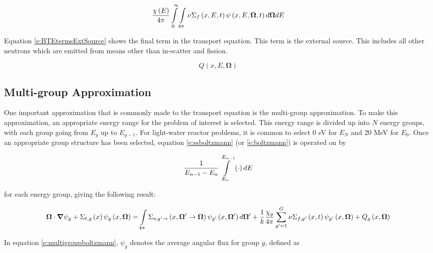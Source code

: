 \begin{equation}\label{e:BTEtermsFissionSource}
\frac{\chi\left(E\right)}{4\pi} \intop_0^{\infty} \intop_{4\pi} \nu \Sigma_f\left(x,E,t\right) \psi\left(x,E,\bm \Omega,t\right) d\bm\Omega dE
\end{equation}

Equation \ref{e:BTEtermsExtSource} shows the final term in the transport equation.  This term is the external source.  This includes all other neutrons which are emitted from means other than in-scatter and fission.

\begin{equation}\label{e:BTEtermsExtSource}
Q\left(x,E,\bm\Omega\right)
\end{equation}

\subsection{Multi-group Approximation}

One important approximation that is commonly made to the transport equation is the multi-group approximation.  To make this approximation, an appropriate energy range for the problem of interest is selected.  This energy range is divided up into $N$ energy groups, with each group going from $E_g$ up to $E_{g-1}$.  For light-water reactor problems, it is common to select 0 eV for $E_N$ and 20 MeV for $E_0$.  Once an appropriate group structure has been selected, equation \ref{e:ssboltzmann} (or \ref{e:boltzmann}) is operated on by 

\begin{equation}
\frac{1}{E_{n-1} - E_n}\intop_{E_n}^{E_{n-1}}\left(\cdot\right)dE
\end{equation}

for each energy group, giving the following result:

\begin{dmath}\label{e:multigroupboltzmann}
{\bm \Omega \cdot \bm \nabla \psi_g + \Sigma_{t,g}\left(x\right)\psi_g\left(x,\bm \Omega\right) = \intop_{4\pi} \Sigma_{s,g'\rightarrow}\left(x,\bm \Omega' \rightarrow \bm \Omega\right) \psi_{g'}\left(x,\bm \Omega'\right) d\bm \Omega'} + {\frac{1}{k}\frac{\chi_g}{4\pi} \sum_{g'=1}^{G} \nu \Sigma_{f,g'}\left(x,t\right) \psi_{g'}\left(x,\bm \Omega\right) + Q_g\left(x,\bm \Omega\right)}
\end{dmath}

In equation \ref{e:multigroupboltzmann}, $\psi_g$ denotes the average angular flux for group $g$, defined as

